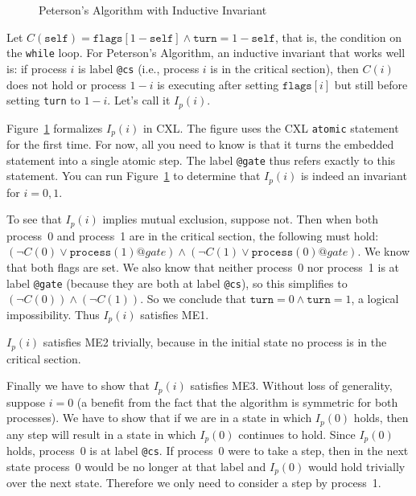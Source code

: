 \documentclass{report}
\newenvironment{code}{
\tcolorbox
}{
\endtcolorbox
}
\begin{document}
\begin{figure}
\begin{code}

\end{code}
\caption{Peterson's Algorithm with Inductive Invariant}
\label{fig:petersonproof}
\end{figure}

Let $C(\mathtt{self}) = \mathtt{flags}[1 - \mathtt{self}] \land
\mathtt{turn} = 1 - \mathtt{self}$, that is, the condition on the \texttt{while} loop.
For Peterson's Algorithm, an inductive invariant that works well is:
if process $i$ is label \texttt{@cs} (i.e., process $i$ is in the critical section),
then $C(i)$ does not hold or process $1-i$ is executing after setting
$\mathtt{flags}[i]$ but still before setting \texttt{turn} to $1-i$.
Let's call it $I_p(i)$.

Figure~\ref{fig:petersonproof} formalizes $I_p(i)$ in CXL.
The figure uses the CXL \texttt{atomic} statement for the first time.
For now, all you need to know is that it turns the embedded statement into
a single atomic step.  The label \texttt{@gate} thus refers exactly to
this statement.  You can run Figure~\ref{fig:petersonproof} to determine
that $I_p(i)$ is indeed an invariant for $i = 0, 1$.

To see that $I_p(i)$ implies mutual exclusion, suppose not.  Then
when both process~0 and process~1 are in the critical section, the
following must hold:
$(\lnot C(0) \lor \mathtt{process}(1)@gate) \land
 (\lnot C(1) \lor \mathtt{process}(0)@gate)$.
We know that both flags are set.
We also know that neither process~0 nor process~1 is at label \texttt{@gate}
(because they are both at label \texttt{@cs}),
so this simplifies to $(\lnot C(0)) \land (\lnot C(1))$.
So we conclude that $\mathtt{turn} = 0 \land \mathtt{turn} = 1$, a
logical impossibility.  Thus $I_p(i)$ satisfies ME1.

$I_p(i)$ satisfies ME2 trivially, because in the initial state no process
is in the critical section.

Finally we have to show that $I_p(i)$ satisfies ME3. Without loss of
generality, suppose $i=0$ (a benefit from the fact that the algorithm is
symmetric for both processes).  We have to show that if we are in a state
in which $I_p(0)$ holds, then any step will result in a state in which
$I_p(0)$ continues to hold.
Since $I_p(0)$ holds, process~0 is at label \texttt{@cs}.  If process~0
were to take a step, then in the next state process~0 would be no longer
at that label and $I_p(0)$ would hold trivially over the next state.
Therefore we only need to consider a step by process~1.
\end{document}
